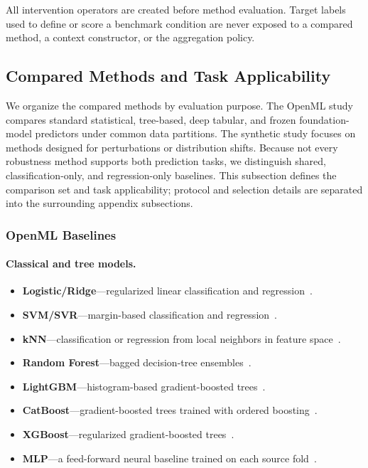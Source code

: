All intervention operators are created before method evaluation.  Target labels
used to define or score a benchmark condition are never exposed to a compared
method, a context constructor, or the aggregation policy.

\FloatBarrier

\subsection{Compared Methods and Task Applicability}
\label{app:baseline_details}

We organize the compared methods by evaluation purpose.  The OpenML study
compares standard statistical, tree-based, deep tabular, and frozen
foundation-model predictors under common data partitions.  The synthetic study
focuses on methods designed for perturbations or distribution shifts.  Because
not every robustness method supports both prediction tasks, we distinguish
shared, classification-only, and regression-only baselines.  This subsection
defines the comparison set and task applicability; protocol and selection
details are separated into the surrounding appendix subsections.

\subsubsection{OpenML Baselines}

\paragraph{Classical and tree models.}
\begin{itemize}
  \setlength{\itemsep}{1pt}
  \setlength{\parskip}{0pt}
  \item \textbf{Logistic/Ridge}---regularized linear classification and
  regression~\citep{cox1958binary,hoerl1970ridge}.
  \item \textbf{SVM/SVR}---margin-based classification and
  regression~\citep{cortes1995svm,drucker1996svr}.
  \item \textbf{kNN}---classification or regression from local neighbors in
  feature space~\citep{cover1967knn}.
  \item \textbf{Random Forest}---bagged decision-tree
  ensembles~\citep{breiman2001randomforests}.
  \item \textbf{LightGBM}---histogram-based gradient-boosted
  trees~\citep{ke2017lightgbm}.
  \item \textbf{CatBoost}---gradient-boosted trees trained with ordered
  boosting~\citep{prokhorenkova2018catboost}.
  \item \textbf{XGBoost}---regularized gradient-boosted
  trees~\citep{chen2016xgboost}.
  \item \textbf{MLP}---a feed-forward neural baseline trained on each source
  fold~\citep{rumelhart1986backprop}.
\end{itemize}


